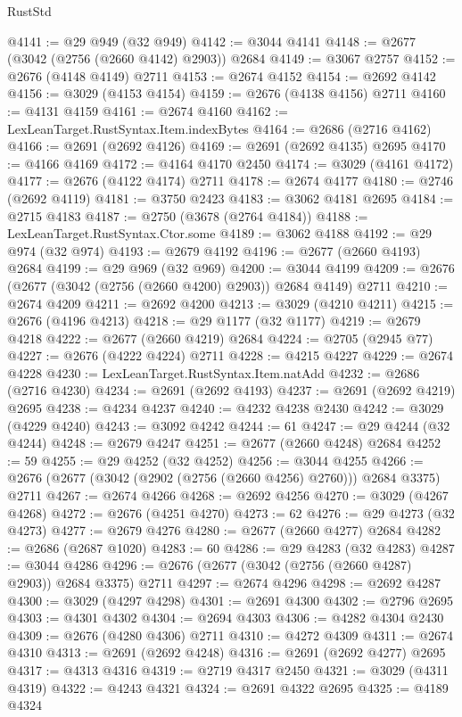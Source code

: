 \begin{lexlean}{RustStd}
\begin{coremodule}
@4141 := @29 @949 (@32 @949)
@4142 := @3044 @4141
@4148 := @2677 (@3042 (@2756 (@2660 @4142) @2903)) @2684
@4149 := @3067 @2757
@4152 := @2676 (@4148 @4149) @2711
@4153 := @2674 @4152
@4154 := @2692 @4142
@4156 := @3029 (@4153 @4154)
@4159 := @2676 (@4138 @4156) @2711
@4160 := @4131 @4159
@4161 := @2674 @4160
@4162 := LexLeanTarget.RustSyntax.Item.indexBytes
@4164 := @2686 (@2716 @4162)
@4166 := @2691 (@2692 @4126)
@4169 := @2691 (@2692 @4135) @2695
@4170 := @4166 @4169
@4172 := @4164 @4170 @2450
@4174 := @3029 (@4161 @4172)
@4177 := @2676 (@4122 @4174) @2711
@4178 := @2674 @4177
@4180 := @2746 (@2692 @4119)
@4181 := @3750 @2423
@4183 := @3062 @4181 @2695
@4184 := @2715 @4183
@4187 := @2750 (@3678 (@2764 @4184))
@4188 := LexLeanTarget.RustSyntax.Ctor.some
@4189 := @3062 @4188
@4192 := @29 @974 (@32 @974)
@4193 := @2679 @4192
@4196 := @2677 (@2660 @4193) @2684
@4199 := @29 @969 (@32 @969)
@4200 := @3044 @4199
@4209 := @2676 (@2677 (@3042 (@2756 (@2660 @4200) @2903)) @2684 @4149) @2711
@4210 := @2674 @4209
@4211 := @2692 @4200
@4213 := @3029 (@4210 @4211)
@4215 := @2676 (@4196 @4213)
@4218 := @29 @1177 (@32 @1177)
@4219 := @2679 @4218
@4222 := @2677 (@2660 @4219) @2684
@4224 := @2705 (@2945 @77)
@4227 := @2676 (@4222 @4224) @2711
@4228 := @4215 @4227
@4229 := @2674 @4228
@4230 := LexLeanTarget.RustSyntax.Item.natAdd
@4232 := @2686 (@2716 @4230)
@4234 := @2691 (@2692 @4193)
@4237 := @2691 (@2692 @4219) @2695
@4238 := @4234 @4237
@4240 := @4232 @4238 @2430
@4242 := @3029 (@4229 @4240)
@4243 := @3092 @4242
@4244 := 61
@4247 := @29 @4244 (@32 @4244)
@4248 := @2679 @4247
@4251 := @2677 (@2660 @4248) @2684
@4252 := 59
@4255 := @29 @4252 (@32 @4252)
@4256 := @3044 @4255
@4266 := @2676 (@2677 (@3042 (@2902 (@2756 (@2660 @4256) @2760))) @2684 @3375) @2711
@4267 := @2674 @4266
@4268 := @2692 @4256
@4270 := @3029 (@4267 @4268)
@4272 := @2676 (@4251 @4270)
@4273 := 62
@4276 := @29 @4273 (@32 @4273)
@4277 := @2679 @4276
@4280 := @2677 (@2660 @4277) @2684
@4282 := @2686 (@2687 @1020)
@4283 := 60
@4286 := @29 @4283 (@32 @4283)
@4287 := @3044 @4286
@4296 := @2676 (@2677 (@3042 (@2756 (@2660 @4287) @2903)) @2684 @3375) @2711
@4297 := @2674 @4296
@4298 := @2692 @4287
@4300 := @3029 (@4297 @4298)
@4301 := @2691 @4300
@4302 := @2796 @2695
@4303 := @4301 @4302
@4304 := @2694 @4303
@4306 := @4282 @4304 @2430
@4309 := @2676 (@4280 @4306) @2711
@4310 := @4272 @4309
@4311 := @2674 @4310
@4313 := @2691 (@2692 @4248)
@4316 := @2691 (@2692 @4277) @2695
@4317 := @4313 @4316
@4319 := @2719 @4317 @2450
@4321 := @3029 (@4311 @4319)
@4322 := @4243 @4321
@4324 := @2691 @4322 @2695
@4325 := @4189 @4324

\end{coremodule}
\end{lexlean}

